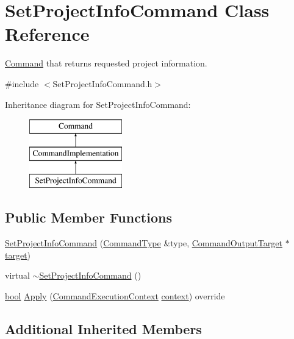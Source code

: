 \hypertarget{class_set_project_info_command}{}\section{Set\+Project\+Info\+Command Class Reference}
\label{class_set_project_info_command}


\hyperlink{class_command}{Command} that returns requested project information.  




{\ttfamily \#include $<$Set\+Project\+Info\+Command.\+h$>$}

Inheritance diagram for Set\+Project\+Info\+Command\+:\begin{figure}[H]
\begin{center}
\leavevmode
\includegraphics[height=3.000000cm]{class_set_project_info_command}
\end{center}
\end{figure}
\subsection*{Public Member Functions}
\begin{DoxyCompactItemize}
\item 
\hyperlink{class_set_project_info_command_a45d89a950e5ca6a1607ed51493bfe86b}{Set\+Project\+Info\+Command} (\hyperlink{class_command_type}{Command\+Type} \&type, \hyperlink{class_command_output_target}{Command\+Output\+Target} $\ast$\hyperlink{lib_2expat_8h_a15a257516a87decb971420e718853137}{target})
\item 
virtual \hyperlink{class_set_project_info_command_a773a4ae0667779dd73353be046b76932}{$\sim$\+Set\+Project\+Info\+Command} ()
\item 
\hyperlink{mac_2config_2i386_2lib-src_2libsoxr_2soxr-config_8h_abb452686968e48b67397da5f97445f5b}{bool} \hyperlink{class_set_project_info_command_a9621503d4d971f53792947954cf8325e}{Apply} (\hyperlink{class_command_execution_context}{Command\+Execution\+Context} \hyperlink{structcontext}{context}) override
\end{DoxyCompactItemize}
\subsection*{Additional Inherited Members}


